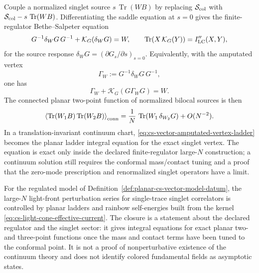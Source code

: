 Couple a normalized singlet source \(s\,\operatorname{Tr}(WB)\) by replacing
\(\mathcal S_{\rm col}\) with
\(\mathcal S_{\rm col}-s\,\operatorname{Tr}(WB)\).  Differentiating the
saddle equation at \(s=0\) gives the finite-regulator Bethe--Salpeter
equation
\begin{equation}
  G^{-1}\delta_WG\,G^{-1}
  +
  \mathcal K_G(\delta_WG)
  =
  W,
  \qquad
  \operatorname{Tr}\!\left(X\,\mathcal K_G(Y)\right)
  =
  I_{\rm LC}''(X,Y),
  \label{eq:cs-vector-bethe-salpeter-deltaG}
\end{equation}
for the source response \(\delta_WG=(\partial G_s/\partial s)_{s=0}\).
Equivalently, with the amputated vertex
\[
  \Gamma_W:=G^{-1}\delta_WG\,G^{-1},
\]
one has
\begin{equation}
  \Gamma_W+\mathcal K_G(G\Gamma_WG)=W .
  \label{eq:cs-vector-amputated-vertex-ladder}
\end{equation}
The connected planar two-point function of normalized bilocal sources is then
\begin{equation}
  \left\langle
    \operatorname{Tr}(W_1B)\operatorname{Tr}(W_2B)
  \right\rangle_{\rm conn}
  =
  \frac1N\,
  \operatorname{Tr}\!\left(W_1\,\delta_{W_2}G\right)
  +O(N^{-2}).
  \label{eq:cs-vector-singlet-two-point-from-ladder}
\end{equation}
In a translation-invariant continuum chart,
\eqref{eq:cs-vector-amputated-vertex-ladder} becomes the planar ladder
integral equation for the exact singlet vertex.  The equation is exact only
inside the declared finite-regulator large-\(N\) construction; a continuum
solution still requires the conformal mass/contact tuning and a proof that the
zero-mode prescription and renormalized singlet operators have a limit.

\begin{controlledapproximation}
\label{ca:planar-cs-vector-light-front-closure}
For the regulated model of Definition~\ref{def:planar-cs-vector-model-datum},
the large-\(N\) light-front perturbation series for single-trace singlet
correlators is controlled by planar ladders and rainbow self-energies built
from the kernel \eqref{eq:cs-light-cone-effective-current}.  The closure is a
statement about the declared regulator and the singlet sector: it gives
integral equations for exact planar two- and three-point functions once the
mass and contact terms have been tuned to the conformal point.  It is not a
proof of nonperturbative existence of the continuum theory and does not identify
colored fundamental fields as asymptotic states.
\end{controlledapproximation}


